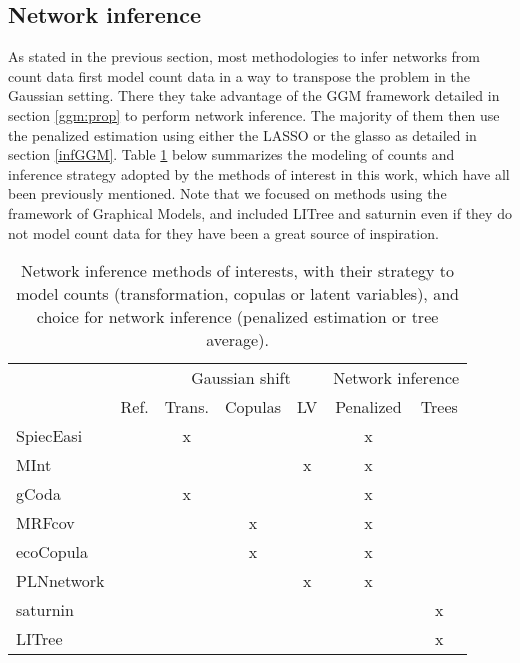  \subsection{Network inference}
 
As stated in the previous section, most methodologies to infer networks from count data first model count data in a way to transpose the problem in the Gaussian setting. There they take advantage of the GGM framework detailed in section \ref{ggm:prop} to perform network inference. The majority of them then use the penalized estimation using either the LASSO or the glasso as detailed in section \ref{infGGM}. Table \ref{tab:infmeth} below summarizes the modeling of counts and inference strategy adopted by the methods of interest in this work, which have all been previously mentioned. Note that we focused on methods using the framework of Graphical Models, and included LITree and saturnin even if they do not model count data for they have been a great source of inspiration.\\

\begin{table}[H]
\begin{tabular}{l|l|ccc|cc|}
\cline{3-7}
\multicolumn{1}{l}{} &\multicolumn{1}{l|}{}& \multicolumn{3}{c|}{ Gaussian shift} & \multicolumn{2}{c|}{Network inference}  \\ \cline{2-7} 
&\multicolumn{1}{l|}{Ref.}& Trans.  & Copulas &LV & Penalized & Trees  \\ \hline
\multicolumn{1}{|l|}{SpiecEasi} &\citet{kurtz}& x &  &  & x &   \\ \hline
\multicolumn{1}{|l|}{MInt} & \citet{MInt}&  &  & x & x &    \\ \hline
\multicolumn{1}{|l|}{gCoda} & \citet{gcoda}& x &  &  & x &   \\ \hline
\multicolumn{1}{|l|}{MRFcov} &\citet{CWL18}&  &  x&  & x &   \\ \hline
\multicolumn{1}{|l|}{ecoCopula} &\citet{PWT19}&  &  x&  & x &    \\ \hline
\multicolumn{1}{|l|}{PLNnetwork} &\citet{PLNnetwork}&  &  &x  & x &    \\ \hline
\multicolumn{1}{|l|}{saturnin} &\citet{SRS15}& \multicolumn{1}{l}{\cellcolor[HTML]{d8d8d8}} & \multicolumn{1}{l}{\cellcolor[HTML]{d8d8d8}} & \multicolumn{1}{l|}{\cellcolor[HTML]{d8d8d8}} & \multicolumn{1}{l}{} & \multicolumn{1}{c|}{x}  \\ \hline
\multicolumn{1}{|l|}{LITree} &\citet{RAR19}& \multicolumn{1}{l}{\cellcolor[HTML]{d8d8d8}} & \multicolumn{1}{l}{\cellcolor[HTML]{d8d8d8}} & \multicolumn{1}{l|}{\cellcolor[HTML]{d8d8d8}} & \multicolumn{1}{l}{} & \multicolumn{1}{c|}{x}  \\ \hline
\end{tabular}
\caption{Network inference methods of interests, with their strategy to model counts (transformation, copulas or latent variables), and choice for network inference (penalized estimation or tree average).}
\label{tab:infmeth}
\end{table} 

